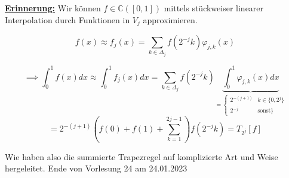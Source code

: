 \documentclass{book}
\def\C{\mathbb{C}}
\begin{document}
            \underline{\textbf{Erinnerung:}} Wir können $f\in \C([0,1])$ mittels stückweiser linearer Interpolation durch Funktionen in $V_j$
            approximieren.

            \[f(x)\approx f_j(x)=\sum_{k\in\Delta_j} f(2^{-j}k)\varphi_{j,k}(x) \]

            \[\implies \int_0^1 f(x)dx\approx \int_0^1 f_j(x)dx=\sum_{k\in\Delta_j}f(2^{-j}k)\underbrace{\int_0^1 \varphi_{j,k}(x)dx}_{=\begin{cases}2^{-(j+1)} & k\in \{0,2^j\}\\ 2^{-j} & \text{sonst}\}\end{cases}}\]
            \[=2^{-(j+1)}(f(0)+f(1)+\sum_{k=1}^{2{j-1}})f(2^{-j}k)=T_{2^j}[f]\]

            Wie haben also die summierte Trapezregel auf komplizierte Art und Weise hergeleitet.
            \noindent
            \xrfill[0.7ex]{1pt}Ende von Vorlesung 24 am 24.01.2023\xrfill[0.7ex]{1pt}
            
\end{document}
